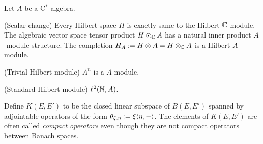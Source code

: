\documentclass{../../../small}
\begin{document}
\begin{ex}
Let $A$ be a C$^*$-algebra.
\begin{parts}
\item (Scalar change) Every Hilbert space $H$ is exactly same to the Hilbert $\mathbb{C}$-module. The algebraic vector space tensor product $H\odot_{\mathbb{C}} A$ has a natural inner product $A$-module structure. The completion $H_ A:=H\otimes A=H\otimes_{\mathbb{C}} A$ is a Hilbert $A$-module.
\item (Trivial Hilbert module) $A^n$ is a $A$-module.
\item (Standard Hilbert module) $\ell^2(\mathbb{N}, A)$.
\end{parts}
\end{ex}

\iffalse
\begin{ex}[Basic constructions]
product, coproducts, pullbacks, pushouts, direct limits
complementations(sub,quo), tensor products........??
localization
\begin{parts}
\item a
\item (Localization) 
Let $A\subset B$ be C$^*$-algebras and let $1_ B\in A$.
Let $\f: B\to A$ be a conditional expectation.
Suppose 
Let $E$ be a Hilbert $A$-mmodule.
\end{parts}
\end{ex}
\fi


\begin{defn}
Define $K(E,E')$ to be the closed linear subspace of $B(E,E')$ spanned by adjointable operators of the form $\theta_{\xi,\eta}:=\xi\langle\eta,-\rangle$.
The elements of $K(E,E')$ are often called \emph{compact operators} even though they are not compact operators between Banach spaces.
\end{defn}
\end{document}
